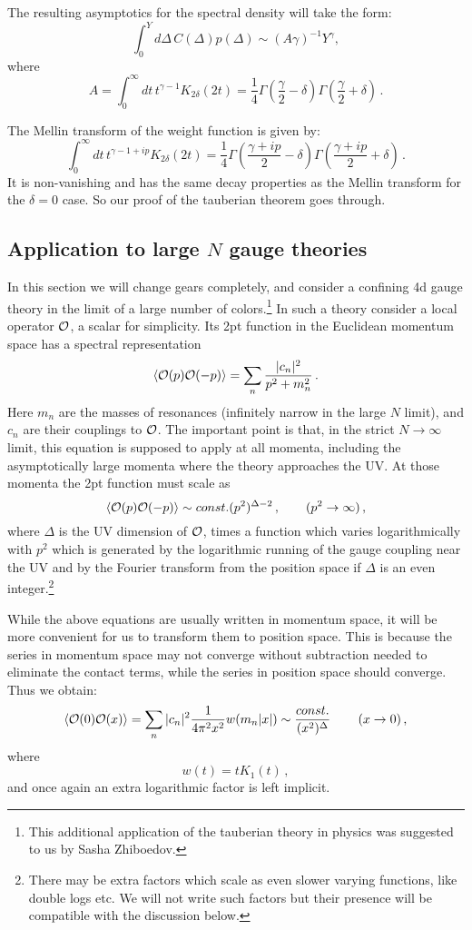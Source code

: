 \documentclass[12pt]{article}
\newcommand{\beq}{\begin{equation}}
\newcommand{\eeq}{\end{equation}}
\def\calO {{\cal O}}
\newcommand{\D}{\Delta}
\numberwithin{equation}{section}
\begin{document}
The resulting asymptotics for the spectral density will take the form:
\beq
\int_0^Y d\Delta\, C(\D) p(\D) \sim (A\gamma)^{-1}Y^\gamma,
\eeq
where 
\beq
A=\int_0^\infty dt\,t^{\gamma-1} K_{2\delta}(2t) = \frac{1}{4} \Gamma
   \left(\frac{\gamma }{2}-\delta
   \right) \Gamma \left(\frac{\gamma
   }{2}+\delta \right)\,.
\eeq


The Mellin transform of the weight function is given by:
\beq
\int_0^\infty dt\,t^{\gamma-1+i p } K_{2\delta}(2 t) = \frac14 \Gamma
   \left(\frac{\gamma+ip }{2}-\delta
   \right) \Gamma \left(\frac{\gamma+ip
   }{2}+\delta \right)\,.
\eeq
It is non-vanishing and has the same decay properties as the Mellin transform for the $\delta=0$ case. So our proof of the tauberian theorem goes through.

\subsection{Application to large $N$ gauge theories}

\label{largeN}
In this section we will change gears completely, and consider a confining 4d gauge theory in the limit of a large number of colors.\footnote{This additional application of the tauberian theory in physics was suggested to us by Sasha Zhiboedov.} In such a theory consider a local operator $\calO$, a scalar for simplicity. Its 2pt function in the Euclidean momentum space has a spectral representation \cite{Witten:1979kh} 
\beq
\langle \calO(p) \calO(-p)\rangle = \sum _n \frac{|c_n|^2}{p^2+m_n^2}\,.
\eeq
Here $m_n$ are the masses of resonances (infinitely narrow in the large $N$ limit), and $c_n$ are their couplings to $\calO$. The important point is that, in the strict $N\to\infty$ limit, this equation is supposed to apply at all momenta, including the asymptotically large momenta where the theory approaches the UV. At those momenta the 2pt function must scale as
\beq
\langle \calO(p) \calO(-p)\rangle \sim const. (p^2)^{\Delta-2}\,, \qquad (p^2\to\infty)\,,
\eeq
where $\Delta$ is the UV dimension of $\calO$, times a function which varies logarithmically with $p^2$ which is generated by the logarithmic running of the gauge coupling near the UV {and by the Fourier transform from the position space if $\Delta$ is an even integer}.\footnote{There may be extra factors which scale as even slower varying functions, like double logs etc. We will not write such factors but their presence will be compatible with the discussion below.}

While the above equations are usually written in momentum space, it will be more convenient for us to transform them to position space. This is because the series in momentum space may not converge without subtraction needed to eliminate the contact terms, while the series in position space should converge. Thus we obtain:
\beq
\langle \calO(0) \calO(x)\rangle = \sum _n |c_n|^2 \frac{1}{4\pi^2 x^2} w(m_n |x|) \sim \frac{const.}{(x^2)^\Delta}\,\qquad (x\to 0)\,,
\eeq
where
\beq
w(t)=t K_1(t)\,,
\eeq
and once again an extra logarithmic factor is left implicit.
\end{document}
